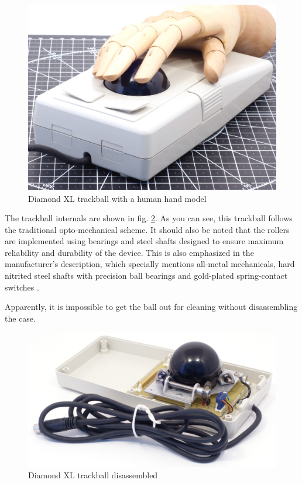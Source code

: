 \documentclass[11pt, a4paper]{article}
\begin{document}
\begin{figure}[h]
    \centering
    \includegraphics[scale=0.4]{1993_evergreen_diamond_xl_trackball/hand_30.jpg}
    \caption{Diamond XL trackball with a human hand model}
    \label{fig:DiamondXLHand}
\end{figure}

The trackball internals are shown in fig. \ref{fig:DiamondXLInside}. As you can see, this trackball follows the traditional opto-mechanical scheme. It should also be noted that the rollers are implemented using bearings and steel shafts designed to ensure maximum reliability and durability of the device. This is also emphasized in the manufacturer's description, which specially mentions all-metal mechanicals, hard nitrited steel shafts with precision ball bearings and gold-plated spring-contact switches \cite{dtxl3}.

Apparently, it is impossible to get the ball out for cleaning without disassembling the case.


\begin{figure}[h]
    \centering
    \includegraphics[scale=0.4]{1993_evergreen_diamond_xl_trackball/inside_30.jpg}
    \caption{Diamond XL trackball disassembled}
    \label{fig:DiamondXLInside}
\end{figure}
\end{document}
